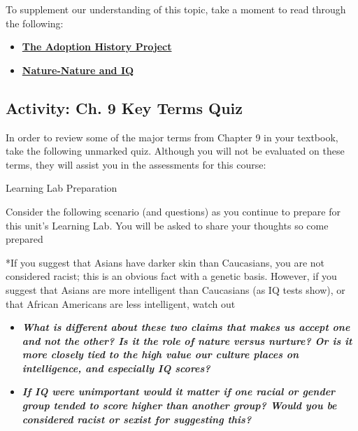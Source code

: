 \documentclass[
]{book}
\providecommand{\tightlist}{%
  \setlength{\itemsep}{0pt}\setlength{\parskip}{0pt}}
\begin{document}
To supplement our understanding of this topic, take a moment to read through the following:

\begin{itemize}
\tightlist
\item
  \href{https://darkwing.uoregon.edu/~adoption/topics/naturenurturestudies.htm}{\textbf{The Adoption History Project}}\\
\item
  \href{http://unisci.com/stories/20012/0417014.htm}{\textbf{Nature-Nature and IQ}}
\end{itemize}

\hypertarget{activity-ch.-9-key-terms-quiz}{%
\subsection*{Activity: Ch. 9 Key Terms Quiz}\label{activity-ch.-9-key-terms-quiz}}

\begin{reflect}
In order to review some of the major terms from Chapter 9 in your textbook, take the following unmarked quiz. Although you will not be evaluated on these terms, they will assist you in the assessments for this course:

{Learning Lab Preparation}

Consider the following scenario (and questions) as you continue to prepare for this unit's Learning Lab. You will be asked to share your thoughts so come prepared

*If you suggest that Asians have darker skin than Caucasians, you are not considered racist; this is an obvious fact with a genetic basis. However, if you suggest that Asians are more intelligent than Caucasians (as IQ tests show), or that African Americans are less intelligent, watch out

\begin{itemize}
\tightlist
\item
  \textbf{\emph{What is different about these two claims that makes us accept one and not the other? Is it the role of nature versus nurture? Or is it more closely tied to the high value our culture places on intelligence, and especially IQ scores?}}\\
\item
  \textbf{\emph{If IQ were unimportant would it matter if one racial or gender group tended to score higher than another group? Would you be considered racist or sexist for suggesting this?}}
\end{itemize}
\end{reflect}
\end{document}

